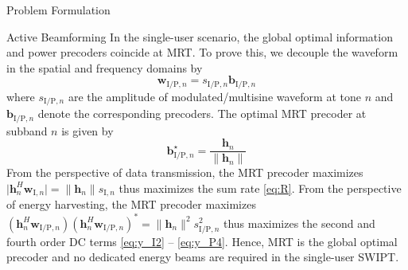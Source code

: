 \documentclass[journal]{IEEEtran}
\begin{document}
\begin{section}{Problem Formulation}
		\begin{subsection}{Active Beamforming}
			In the single-user scenario, the global optimal information and power precoders coincide at MRT. To prove this, we decouple the waveform in the spatial and frequency domains by
			\begin{equation}
				\boldsymbol{w}_{\mathrm{I/P}, n} = s_{\mathrm{I/P}, n} \boldsymbol{b}_{\mathrm{I/P}, n}
			\end{equation}
			where $s_{\mathrm{I/P},n}$ are the amplitude of modulated/multisine waveform at tone $n$ and $\boldsymbol{b}_{\mathrm{I/P}, n}$ denote the corresponding precoders. The optimal MRT precoder at subband $n$ is given by
			\begin{equation}
				\boldsymbol{b}_{\mathrm{I/P}, n}^\star = \frac{\boldsymbol{h}_n}{\lVert{\boldsymbol{h}_n}\rVert}
			\end{equation}
			From the perspective of data transmission, the MRT precoder maximizes $\lvert{\boldsymbol{h}_{n}^H \boldsymbol{w}_{\mathrm{I}, n}}\rvert = \lVert{\boldsymbol{h}_{n}}\rVert s_{\mathrm{I}, n}$ thus maximizes the sum rate \eqref{eq:R}. From the perspective of energy harvesting, the MRT precoder maximizes $(\boldsymbol{h}_{n}^H \boldsymbol{w}_{\mathrm{I/P}, n})(\boldsymbol{h}_{n}^H \boldsymbol{w}_{\mathrm{I/P}, n})^* = \lVert{\boldsymbol{h}_{n}}\rVert^2 s_{\mathrm{I/P}, n}^2$ thus maximizes the second and fourth order DC terms \eqref{eq:y_I2} -- \eqref{eq:y_P4}. Hence, MRT is the global optimal precoder and no dedicated energy beams are required in the single-user SWIPT.
		\end{subsection}



\end{section}
\end{document}

